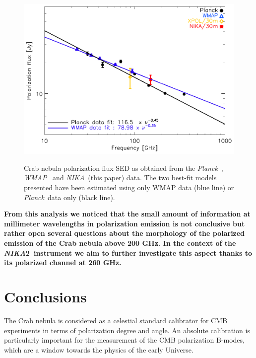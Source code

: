 \documentclass[twocolumn,traditabstract]{aa}
\def\NIKA{\textit{NIKA}}
\def\Planck{\textit{Planck}}
\def\WMAP{\textit{WMAP}}
\begin{document}
\begin{figure}
  \centering
             { \includegraphics[width=1\linewidth,keepaspectratio]{figures/Crab_SED_ipol_test.pdf}}
           \caption{Crab nebula polarization flux SED as obtained from the \Planck\ \citep{2015arXiv150702058P}, \WMAP\ \citep{2011ApJS..192...19W} and \NIKA\ (this paper) data. The two best-fit models presented have been estimated using only WMAP data (blue line) or \Planck\ data only (black line).}
\label{crab_SED_ipol}		
  \end{figure} 
 \noindent
\textbf{From this analysis we noticed that the small amount of information at millimeter wavelengths in polarization emission is not conclusive but rather open several questions about the morphology of the polarized emission of the Crab nebula above 200 GHz. In the context of the \NIKA2\ instrument we aim to further investigate this aspect thanks to its polarized channel at 260 GHz.} 


\section{Conclusions}\label{sec:conclusions}
The Crab nebula is considered as a celestial standard calibrator for CMB experiments in
terms of polarization degree and angle. An absolute calibration is
particularly important for the measurement of the CMB polarization B-modes,
which are a window towards the physics of the early Universe.
\end{document}
